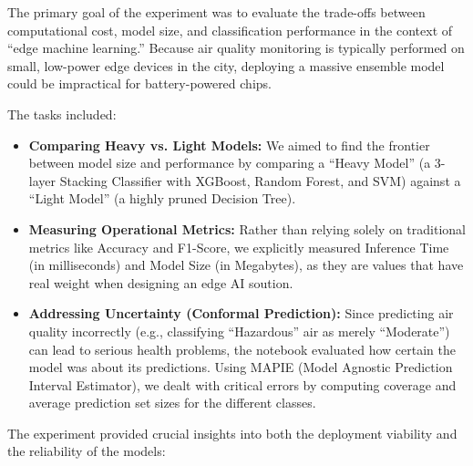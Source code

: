 \documentclass[a4paper,12pt]{article}
\begin{document}
	The primary goal of the experiment was to evaluate the trade-offs between computational cost, model size, and classification performance in the context of ``edge machine learning.'' Because air quality monitoring is typically performed on small, low-power edge devices in the city, deploying a massive ensemble model could be impractical for battery-powered chips.
	
	The tasks included:
	
	\begin{itemize}
		\item \textbf{Comparing Heavy vs. Light Models:} We aimed to find the frontier between model size and performance by comparing a ``Heavy Model'' (a 3-layer Stacking Classifier with XGBoost, Random Forest, and SVM) against a ``Light Model'' (a highly pruned Decision Tree).
		
		\item \textbf{Measuring Operational Metrics:} Rather than relying solely on traditional metrics like Accuracy and F1-Score, we explicitly measured Inference Time (in milliseconds) and Model Size (in Megabytes), as they are values that have real weight when designing an edge AI soution.
		
		\item \textbf{Addressing Uncertainty (Conformal Prediction):} Since predicting air quality incorrectly (e.g., classifying ``Hazardous'' air as merely ``Moderate'') can lead to serious health problems, the notebook evaluated how certain the model was about its predictions. Using MAPIE (Model Agnostic Prediction Interval Estimator), we dealt with critical errors by computing coverage and average prediction set sizes for the different classes.
	\end{itemize}
	
	
	The experiment provided crucial insights into both the deployment viability and the reliability of the models:
	
\end{document}
